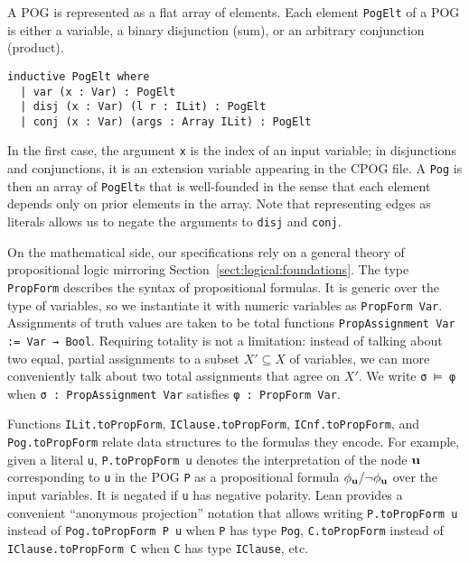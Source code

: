 A POG is represented as a flat array of elements.
Each element {\tt PogElt} of a POG is either a variable,
a binary disjunction (sum),
or an arbitrary conjunction (product).
\begin{lstlisting}
inductive PogElt where
  | var (x : Var) : PogElt
  | disj (x : Var) (l r : ILit) : PogElt
  | conj (x : Var) (args : Array ILit) : PogElt
\end{lstlisting}
In the first case,
the argument \lstinline{x} is the index of an input variable;
in disjunctions and conjunctions,
it is an extension variable appearing in the CPOG file.
A \lstinline{Pog} is then an array of \lstinline{PogElt}s that is well-founded
in the sense that each element depends only on prior elements in the array.
Note that representing edges as literals
allows us to negate the arguments to \lstinline{disj} and \lstinline{conj}.

On the mathematical side,
our specifications rely on a general theory of propositional logic
mirroring Section~\ref{sect:logical:foundations}.
The type \lstinline{PropForm} describes the syntax of propositional formulas.
It is generic over the type of variables,
so we instantiate it with numeric variables as \lstinline{PropForm Var}.
Assignments of truth values are taken to be total functions \lstinline{PropAssignment Var := Var → Bool}.
Requiring totality is not a limitation:
instead of talking about two equal,
partial assignments to a subset $X' \subseteq X$ of variables,
we can more conveniently talk about two total assignments that agree on $X'$.
We write \lstinline{σ ⊨ φ} when \lstinline{σ : PropAssignment Var} satisfies \lstinline{φ : PropForm Var}.

Functions \lstinline{ILit.toPropForm},
\lstinline{IClause.toPropForm},
\lstinline{ICnf.toPropForm},
and \lstinline{Pog.toPropForm}
relate data structures to the formulas they encode.
For example, given a literal \lstinline{u},
\lstinline{P.toPropForm u} denotes the interpretation
of the node $\mathbf{u}$ corresponding to \lstinline{u} in the POG \lstinline{P}
as a propositional formula $\phi_{\mathbf{u}}/\neg\phi_{\mathbf{u}}$
over the input variables.
It is negated if \lstinline{u} has negative polarity.
Lean provides a convenient ``anonymous projection'' notation
that allows writing \lstinline{P.toPropForm u} instead of \lstinline{Pog.toPropForm P u}
when \lstinline{P} has type \lstinline{Pog},
\lstinline{C.toPropForm} instead of \lstinline{IClause.toPropForm C}
when \lstinline{C} has type \lstinline{IClause},
etc.

